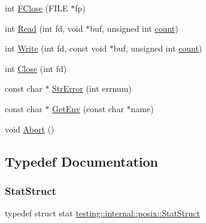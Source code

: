 \begin{DoxyCompactItemize}
int \mbox{\hyperlink{namespacetesting_1_1internal_1_1posix_af4beeaaa8d62916d5e3b644a1ddfbd6b}{F\+Close}} (F\+I\+LE $\ast$fp)
\item 
int \mbox{\hyperlink{namespacetesting_1_1internal_1_1posix_a3c6ab13e581a56f1b02f3eb7536c97fd}{Read}} (int fd, void $\ast$buf, unsigned int \mbox{\hyperlink{_obj__test_2lib_2googletest-release-1_88_81_2googlemock_2test_2gmock__stress__test_8cc_afd9db40e3361ae09188795e8cbe19752}{count}})
\item 
int \mbox{\hyperlink{namespacetesting_1_1internal_1_1posix_af4acf9f78d55f815a18b43786511abef}{Write}} (int fd, const void $\ast$buf, unsigned int \mbox{\hyperlink{_obj__test_2lib_2googletest-release-1_88_81_2googlemock_2test_2gmock__stress__test_8cc_afd9db40e3361ae09188795e8cbe19752}{count}})
\item 
int \mbox{\hyperlink{namespacetesting_1_1internal_1_1posix_a15e5b8f2a535ef1b2529b85b861e4846}{Close}} (int fd)
\item 
const char $\ast$ \mbox{\hyperlink{namespacetesting_1_1internal_1_1posix_a6e7e77c37cacb64c32234b988b10933c}{Str\+Error}} (int errnum)
\item 
const char $\ast$ \mbox{\hyperlink{namespacetesting_1_1internal_1_1posix_aa78973d3f7aa4efd24742b0537c8cd50}{Get\+Env}} (const char $\ast$name)
\item 
void \mbox{\hyperlink{namespacetesting_1_1internal_1_1posix_a69b8278c59359dd6a6f941b4643db9fb}{Abort}} ()
\end{DoxyCompactItemize}


\subsection{Typedef Documentation}
\mbox{\label{namespacetesting_1_1internal_1_1posix_a8eb9f08d3af29941c2d2a964cfff3ecb}} 
\subsubsection{\texorpdfstring{StatStruct}{StatStruct}}
{\footnotesize\ttfamily typedef struct stat \mbox{\hyperlink{namespacetesting_1_1internal_1_1posix_a8eb9f08d3af29941c2d2a964cfff3ecb}{testing\+::internal\+::posix\+::\+Stat\+Struct}}}



